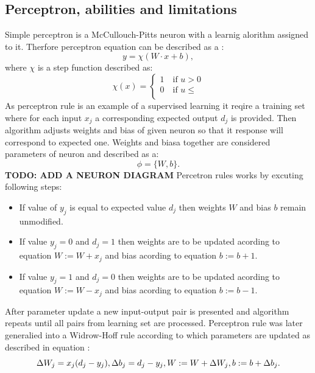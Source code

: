 \subsection{Perceptron, abilities and limitations}
Simple perceptron is a McCullouch-Pitts neuron with a learnig alorithm assigned to it.
Therfore perceptron equation can be described as a :
\begin{equation}
	y = \chi (W\cdot x+b),
\end{equation}
where $\chi$ is a step function described as:
\begin{equation}
	\chi (x) =  
	\begin{cases}
		1        \quad \text{if } u > 0\\
		0        \quad \text{if } u \leq \\
	\end{cases}
\end{equation}
As perceptron rule is an example of a supervised learning it reqire a training set where for 
each input $x_{j}$ a corresponding expected output $d_{j}$ is provided. 
Then algorithm adjusts weights and bias of given neuron so that it response will 
correspond to expected one. 
Weights and biasa together are considered parameters of neuron and described as a:
\begin{equation}
	\phi = \{ W,b \}.
\end{equation}
\textbf{TODO: ADD A NEURON DIAGRAM}
Percetron rules works by excuting following steps:
\begin{itemize}
	\item If value of $y_{j}$ is equal to expected value $d_{j}$ then weights $W$ and 
		  bias $b$ remain unmodified.
	\item If value $y_{j}=0$ and $d_{j}=1$ then weights are to be updated acording to 
		  equation $W:=W+x_{j}$ and bias acording to equation $b:=b+1$.
	\item If value $y_{j}=1$ and $d_{j}=0$ then weights are to be updated acording to 
		  equation $W:=W-x_{j}$ and bias acording to equation $b:=b-1$.
\end{itemize}
After parameter update a new input-output pair is presented and algorithm repeats until all 
pairs from learning set are processed.
Perceptron rule was later generalied into a Widrow-Hoff rule according to which parameters are 
updated as described in equation :
\begin{equation}
	\Delta W_{j} = x_{j}(d_{j}-y_{j}),\\
	\Delta b_{j} = d_{j} - y_{j},\\
	W :=  W + \Delta W_{j},\\
	b := b + \Delta b_{j}.
\end{equation}
